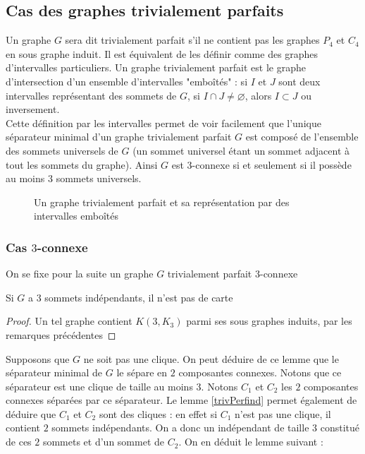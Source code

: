 \documentclass{scrartcl}
\begin{document}
\begin{flushleft}
\subsection{Cas des graphes trivialement parfaits}

Un graphe $G$ sera dit trivialement parfait s'il ne contient pas les graphes $P_4$ et $C_4$ en sous graphe induit.
Il est équivalent de les définir comme des graphes d'intervalles particuliers. Un graphe trivialement parfait est le graphe
d'intersection d'un ensemble d'intervalles "emboîtés" : si $I$ et $J$ sont deux intervalles représentant des sommets de $G$,
si $I \cap J \neq \varnothing$, alors $I \subset J$ ou inversement.\\
Cette définition par les intervalles permet de voir facilement que l'unique séparateur minimal d'un graphe trivialement parfait $G$ est
composé de l'ensemble des sommets universels de $G$ (un sommet universel étant un sommet adjacent à tout les sommets du graphe). Ainsi
$G$ est $3$-connexe si et seulement si il possède au moins $3$ sommets universels.

\begin{figure}[h]
    \caption{Un graphe trivialement parfait et sa représentation par des intervalles emboîtés}
\end{figure}

\subsubsection{Cas $3$-connexe}

On se fixe pour la suite un graphe $G$ trivialement parfait $3$-connexe

\begin{lem}\label{trivPerfind}
    Si $G$ a $3$ sommets indépendants, il n'est pas de carte
\end{lem}

\begin{proof}
    Un tel graphe contient $K(3, K_3)$ parmi ses sous graphes induits, par les remarques précédentes
\end{proof}

Supposons que $G$ ne soit pas une clique.
On peut déduire de ce lemme que le séparateur minimal de $G$ le sépare en $2$ composantes connexes. Notons que ce séparateur est une
clique de taille au moins $3$. Notons $C_1$ et $C_2$ les $2$ composantes connexes séparées par ce séparateur. Le lemme
\ref{trivPerfind} permet également de déduire que $C_1$ et $C_2$ sont des cliques : en effet si $C_1$ n'est pas une clique,
il contient $2$ sommets indépendants. On a donc un indépendant de taille $3$ constitué de ces $2$ sommets et d'un sommet de $C_2$.
On en déduit le lemme suivant :


\end{flushleft}
\end{document}
